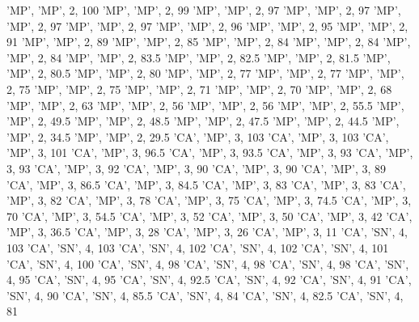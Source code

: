 \documentclass[
]{book}
\newenvironment{Shaded}{\begin{snugshade}}{\end{snugshade}}
\newcommand{\StringTok}[1]{\textcolor[rgb]{0.31,0.60,0.02}{#1}}
\begin{document}
\begin{Shaded}
\begin{Highlighting}[]
\StringTok{ 'MP', 'MP', 2, 100}
\StringTok{ 'MP', 'MP', 2, 99}
\StringTok{ 'MP', 'MP', 2, 97}
\StringTok{ 'MP', 'MP', 2, 97}
\StringTok{ 'MP', 'MP', 2, 97}
\StringTok{ 'MP', 'MP', 2, 97}
\StringTok{ 'MP', 'MP', 2, 96}
\StringTok{ 'MP', 'MP', 2, 95}
\StringTok{ 'MP', 'MP', 2, 91}
\StringTok{ 'MP', 'MP', 2, 89}
\StringTok{ 'MP', 'MP', 2, 85}
\StringTok{ 'MP', 'MP', 2, 84}
\StringTok{ 'MP', 'MP', 2, 84}
\StringTok{ 'MP', 'MP', 2, 84}
\StringTok{ 'MP', 'MP', 2, 83.5}
\StringTok{ 'MP', 'MP', 2, 82.5}
\StringTok{ 'MP', 'MP', 2, 81.5}
\StringTok{ 'MP', 'MP', 2, 80.5}
\StringTok{ 'MP', 'MP', 2, 80}
\StringTok{ 'MP', 'MP', 2, 77}
\StringTok{ 'MP', 'MP', 2, 77}
\StringTok{ 'MP', 'MP', 2, 75}
\StringTok{ 'MP', 'MP', 2, 75}
\StringTok{ 'MP', 'MP', 2, 71}
\StringTok{ 'MP', 'MP', 2, 70}
\StringTok{ 'MP', 'MP', 2, 68}
\StringTok{ 'MP', 'MP', 2, 63}
\StringTok{ 'MP', 'MP', 2, 56}
\StringTok{ 'MP', 'MP', 2, 56}
\StringTok{ 'MP', 'MP', 2, 55.5}
\StringTok{ 'MP', 'MP', 2, 49.5}
\StringTok{ 'MP', 'MP', 2, 48.5}
\StringTok{ 'MP', 'MP', 2, 47.5}
\StringTok{ 'MP', 'MP', 2, 44.5}
\StringTok{ 'MP', 'MP', 2, 34.5}
\StringTok{ 'MP', 'MP', 2, 29.5}
\StringTok{ 'CA', 'MP', 3, 103}
\StringTok{ 'CA', 'MP', 3, 103}
\StringTok{ 'CA', 'MP', 3, 101}
\StringTok{ 'CA', 'MP', 3, 96.5}
\StringTok{ 'CA', 'MP', 3, 93.5}
\StringTok{ 'CA', 'MP', 3, 93}
\StringTok{ 'CA', 'MP', 3, 93}
\StringTok{ 'CA', 'MP', 3, 92}
\StringTok{ 'CA', 'MP', 3, 90}
\StringTok{ 'CA', 'MP', 3, 90}
\StringTok{ 'CA', 'MP', 3, 89}
\StringTok{ 'CA', 'MP', 3, 86.5}
\StringTok{ 'CA', 'MP', 3, 84.5}
\StringTok{ 'CA', 'MP', 3, 83}
\StringTok{ 'CA', 'MP', 3, 83}
\StringTok{ 'CA', 'MP', 3, 82}
\StringTok{ 'CA', 'MP', 3, 78}
\StringTok{ 'CA', 'MP', 3, 75}
\StringTok{ 'CA', 'MP', 3, 74.5}
\StringTok{ 'CA', 'MP', 3, 70}
\StringTok{ 'CA', 'MP', 3, 54.5}
\StringTok{ 'CA', 'MP', 3, 52}
\StringTok{ 'CA', 'MP', 3, 50}
\StringTok{ 'CA', 'MP', 3, 42}
\StringTok{ 'CA', 'MP', 3, 36.5}
\StringTok{ 'CA', 'MP', 3, 28}
\StringTok{ 'CA', 'MP', 3, 26}
\StringTok{ 'CA', 'MP', 3, 11}
\StringTok{ 'CA', 'SN', 4, 103}
\StringTok{ 'CA', 'SN', 4, 103}
\StringTok{ 'CA', 'SN', 4, 102}
\StringTok{ 'CA', 'SN', 4, 102}
\StringTok{ 'CA', 'SN', 4, 101}
\StringTok{ 'CA', 'SN', 4, 100}
\StringTok{ 'CA', 'SN', 4, 98}
\StringTok{ 'CA', 'SN', 4, 98}
\StringTok{ 'CA', 'SN', 4, 98}
\StringTok{ 'CA', 'SN', 4, 95}
\StringTok{ 'CA', 'SN', 4, 95}
\StringTok{ 'CA', 'SN', 4, 92.5}
\StringTok{ 'CA', 'SN', 4, 92}
\StringTok{ 'CA', 'SN', 4, 91}
\StringTok{ 'CA', 'SN', 4, 90}
\StringTok{ 'CA', 'SN', 4, 85.5}
\StringTok{ 'CA', 'SN', 4, 84}
\StringTok{ 'CA', 'SN', 4, 82.5}
\StringTok{ 'CA', 'SN', 4, 81}

\end{Highlighting}
\end{Shaded}
\end{document}
